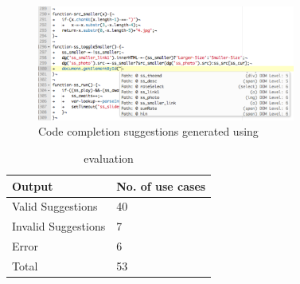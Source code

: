 	
	
	\begin{figure}
		\centering
		\includegraphics[width=85mm]{images/accuracy.pdf}
		\caption{Code completion suggestions generated using \dompletion}
		\label{Fig:Accuracy}
	\end{figure}
	
	\begin{table}
	{
		\scriptsize
		\begin{tabular}{ p{3.8cm} | p{3.8cm}}
  			\hline                        
  			\textbf{Output} & \textbf{No. of use cases} \\ \hline \hline
  			Valid Suggestions &  40 \\ \hline
			Invalid Suggestions & 7 \\ \hline
			Error & 6 \\ \hline
			Total & 53 \\ 
			\hline  
		\end{tabular}
	}
	\caption {\dompletion evaluation}
	\label{Table:Accuracy}		
	\end{table}
	
	
	
	
